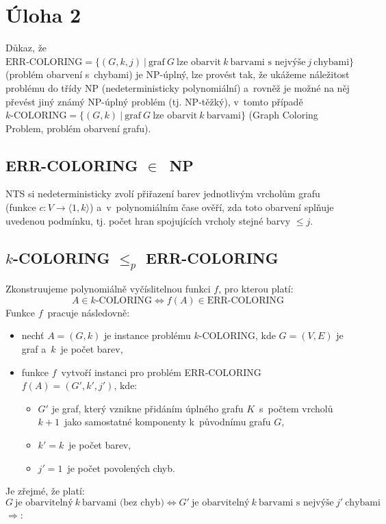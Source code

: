 \documentclass[a4paper, 11pt]{article}
\begin{document}
\newpage

\section*{Úloha 2}

Důkaz, že $\textrm{ERR-COLORING} = \{ (G, k, j)\ |\ \textrm{graf}\ G\ \textrm{lze obarvit}\ k\ \textrm{barvami s~nejvýše}\ j\ \textrm{chybami} \}$ (problém obarvení s~chybami) je NP-úplný, lze provést tak, že ukážeme náležitost problému do třídy NP (nedeterministicky polynomiální) a~rovněž je možné na něj převést jiný známý NP-úplný problém (tj. NP-těžký), v~tomto případě $k\textrm{-COLORING} = \{ (G, k)\ |\ \textrm{graf}\ G\ \textrm{lze obarvit}\ k\ \textrm{barvami} \}$ (Graph Coloring Problem, problém obarvení grafu).

\subsection*{ERR-COLORING $\in$~NP}

NTS si nedeterministicky zvolí přiřazení barev jednotlivým vrcholům grafu (funkce $c : V \rightarrow \langle 1, k \rangle$) a~v~polynomiálním čase ověří, zda toto obarvení splňuje uvedenou podmínku, tj. počet hran spojujících vrcholy stejné barvy $\leq j$.

\subsection*{$k$-COLORING $\leq_p$ ERR-COLORING}

Zkonstruujeme polynomiálně vyčíslitelnou funkci $f$, pro kterou platí:
$$A \in k\textrm{-COLORING} \Leftrightarrow f(A) \in \textrm{ERR-COLORING}$$
Funkce $f$~pracuje následovně:

\begin{itemize}
    \item nechť $A = (G, k)$ je instance problému $k$-COLORING, kde $G = (V, E)$ je graf a~$k$~je počet barev,
    \item funkce $f$~vytvoří instanci pro problém ERR-COLORING $f(A) = (G', k', j')$, kde:
    \begin{itemize}
        \item $G'$ je graf, který vznikne přidáním úplného grafu $K$~s~počtem vrcholů $k + 1$~jako samostatné komponenty k~původnímu grafu $G$,
        \item $k' = k$~je počet barev,
        \item $j' = 1$~je počet povolených chyb.
    \end{itemize}
\end{itemize}
Je zřejmé, že platí:
$$G\ \textrm{je obarvitelný}\ k\ \textrm{barvami (bez chyb)} \Leftrightarrow G'\ \textrm{je obarvitelný}\ k\ \textrm{barvami s~nejvýše}\ j'\ \textrm{chybami}$$
$\Rightarrow:$
\end{document}
